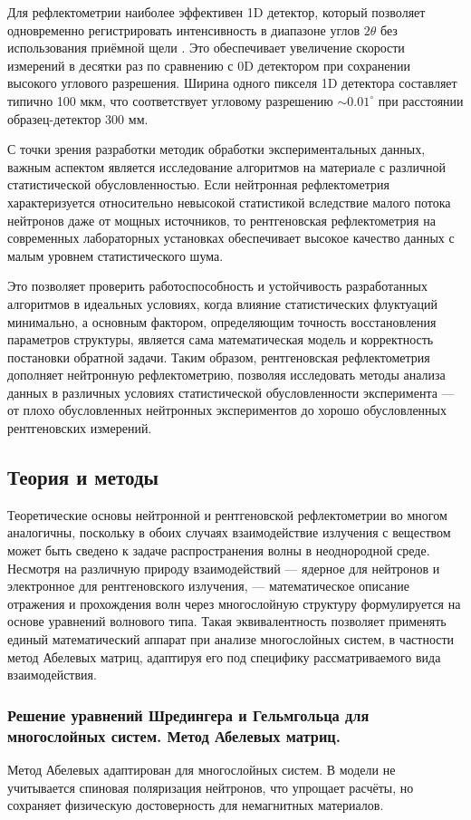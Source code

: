 \documentclass[a4paper]{article}
\begin{document}
Для рефлектометрии наиболее эффективен 1D детектор, который позволяет одновременно регистрировать интенсивность в диапазоне углов $2\theta$ без использования приёмной щели \cite{32}. Это обеспечивает увеличение скорости измерений в десятки раз по сравнению с 0D детектором при сохранении высокого углового разрешения. Ширина одного пикселя 1D детектора составляет типично 100 мкм, что соответствует угловому разрешению $\sim 0.01^\circ$ при расстоянии образец-детектор 300 мм.

С точки зрения разработки методик обработки экспериментальных данных, важным аспектом является исследование алгоритмов на материале с различной статистической обусловленностью. Если нейтронная рефлектометрия характеризуется относительно невысокой статистикой вследствие малого потока нейтронов даже от мощных источников, то рентгеновская рефлектометрия на современных лабораторных установках обеспечивает высокое качество данных с малым уровнем статистического шума. 

Это позволяет проверить работоспособность и устойчивость разработанных алгоритмов в идеальных условиях, когда влияние статистических флуктуаций минимально, а основным фактором, определяющим точность восстановления параметров структуры, является сама математическая модель и корректность постановки обратной задачи. Таким образом, рентгеновская рефлектометрия дополняет нейтронную рефлектометрию, позволяя исследовать методы анализа данных в различных условиях статистической обусловленности эксперимента — от плохо обусловленных нейтронных экспериментов до хорошо обусловленных рентгеновских измерений.

\subsection{Теория и методы}
Теоретические основы нейтронной и рентгеновской рефлектометрии во многом аналогичны, поскольку в обоих случаях взаимодействие излучения с веществом может быть сведено к задаче распространения волны в неоднородной среде. Несмотря на различную природу взаимодействий — ядерное для нейтронов и электронное для рентгеновского излучения, — математическое описание отражения и прохождения волн через многослойную структуру формулируется на основе уравнений волнового типа. Такая эквивалентность позволяет применять единый математический аппарат при анализе многослойных систем, в частности метод Абелевых матриц, адаптируя его под специфику рассматриваемого вида взаимодействия.


\subsubsection{Решение уравнений Шредингера и Гельмгольца для многослойных систем. Метод Абелевых матриц.}
Метод Абелевых адаптирован для многослойных систем. В модели не учитывается спиновая поляризация нейтронов, что упрощает расчёты, но сохраняет физическую достоверность для немагнитных материалов. 
\end{document}
